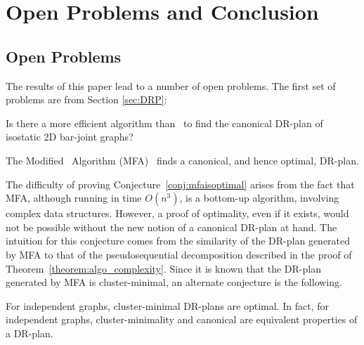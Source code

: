 \section{Open Problems and Conclusion}
\label{sec:probs_and_conclusion}



\subsection{Open Problems}
\label{sec:appendix:b}
\label{sec:futurework}
\label{sec:open}

The results of this paper lead to a number of open problems.
The first set of problems are from Section \ref{sec:DRP}:
\begin{openproblem}
    Is there a more efficient algorithm than \ComplexityCanDRPV\ to find the canonical DR-plan of isostatic 2D bar-joint graphs?
\end{openproblem}

\begin{conjecture}
\label{conj:mfaisoptimal}
    The Modified \frontier\ Algorithm (MFA)~\cite{lomonosov2004graph} finds a canonical, and hence optimal, DR-plan.
\end{conjecture}

The difficulty of proving Conjecture~\ref{conj:mfaisoptimal} arises from the fact that MFA, although running in time $O(n^3)$, is a bottom-up algorithm, involving complex data structures. However, a proof of optimality, even if it exists, would not be possible without the new notion of a canonical DR-plan at hand. The intuition for this conjecture comes from the similarity of the DR-plan generated by MFA to that of the pseudosequential decomposition described in the proof of Theorem~\ref{theorem:algo_complexity}. Since it is known \cite{lomonosov2004graph} that the DR-plan generated by MFA is cluster-minimal, an alternate conjecture is the following.

\begin{conjecture}
\label{conj:mfaisoptimal:rephrase}
    For independent graphs, cluster-minimal DR-plans are optimal. In fact, for independent graphs, cluster-minimality and canonical are equivalent properties of a DR-plan.
\end{conjecture}


